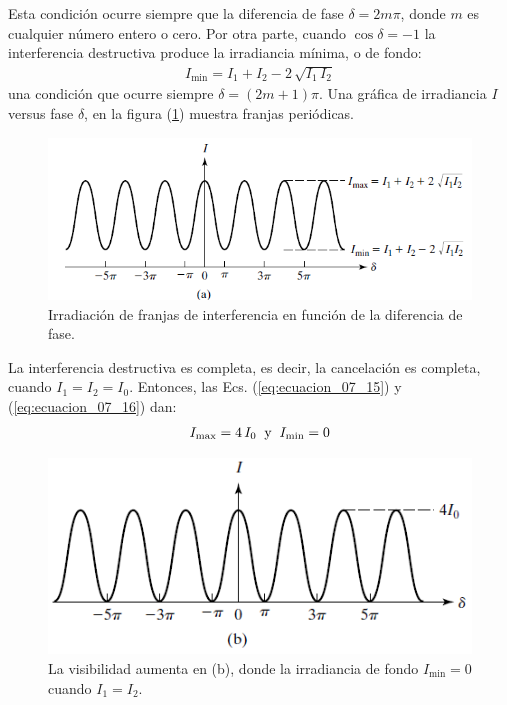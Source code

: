 \documentclass[14pt]{extarticle}
\begin{document}
Esta condición ocurre siempre que la diferencia de fase $\delta = 2 m \pi$, donde $m$ es cualquier número entero o cero. Por otra parte, cuando $\cos \delta = -1$ la interferencia destructiva produce la irradiancia mínima, o de fondo:
\begin{align}
I_{\min} = I_{1} + I_{2} - 2 \, \sqrt{I_{1} \, I_{2}}
\label{eq:ecuacion_07_16}
\end{align}
una condición que ocurre siempre $\delta = (2 m + 1) \pi$. Una gráfica de irradiancia $I$ versus fase $\delta$, en la figura (\ref{fig:figura_07_02a})  muestra franjas periódicas.
\begin{figure}[H]
    \centering
    \includegraphics[scale=0.8]{Imagenes/Interferencia2_02a.png}
    \caption{Irradiación de franjas de interferencia en función de la diferencia de fase.}
    \label{fig:figura_07_02a}
\end{figure}
La interferencia destructiva es completa, es decir, la cancelación es completa, cuando $I_{1} = I_{2} = I_{0}$. Entonces, las Ecs. (\ref{eq:ecuacion_07_15}) y (\ref{eq:ecuacion_07_16}) dan:
\begin{align*}
I_{\max} = 4 \, I_{0} \hspace{0.2cm} \text{y} \hspace{0.2cm} I_{\min} = 0
\end{align*}
\begin{figure}[H]
    \centering
    \includegraphics[scale=0.8]{Imagenes/Interferencia2_02b.png}
    \caption{La visibilidad aumenta en (b), donde la irradiancia de fondo $I_{\min} = 0$ cuando $I_{1} = I_{2}$.}
    \label{fig:figura_07_02b}
\end{figure}
\end{document}
